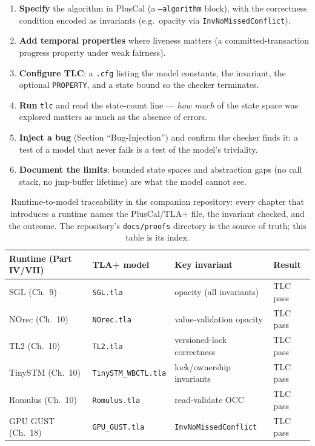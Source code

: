 \begin{enumerate}
    \item \textbf{Specify} the algorithm in PlusCal (a \texttt{--algorithm} block), with the correctness condition encoded as invariants (e.g.\ opacity via \texttt{InvNoMissedConflict}).
    \item \textbf{Add temporal properties} where liveness matters (a committed-transaction progress property under weak fairness).
    \item \textbf{Configure TLC}: a \texttt{.cfg} listing the model constants, the invariant, the optional \texttt{PROPERTY}, and a state bound so the checker terminates.
    \item \textbf{Run} \texttt{tlc} and read the state-count line --- \emph{how much} of the state space was explored matters as much as the absence of errors.
    \item \textbf{Inject a bug} (Section ``Bug-Injection'') and confirm the checker finds it: a test of a model that never fails is a test of the model's triviality.
    \item \textbf{Document the limits}: bounded state spaces and abstraction gaps (no call stack, no jmp-buffer lifetime) are what the model cannot see.
\end{enumerate}

\begin{table}[ht]
\centering
\small
\begin{tabular}{llll}
\hline
\textbf{Runtime (Part IV/VII)} & \textbf{TLA+ model} & \textbf{Key invariant} & \textbf{Result} \\
\hline
SGL (Ch.~9)     & \texttt{SGL.tla}         & opacity (all invariants) & TLC pass \\
NOrec (Ch.~10)   & \texttt{NOrec.tla}       & value-validation opacity  & TLC pass \\
TL2 (Ch.~10)     & \texttt{TL2.tla}         & versioned-lock correctness & TLC pass \\
TinySTM (Ch.~10) & \texttt{TinySTM\_WBCTL.tla} & lock/ownership invariants & TLC pass \\
Romulus (Ch.~10) & \texttt{Romulus.tla}     & read-validate OCC          & TLC pass \\
GPU GUST (Ch.~18)& \texttt{GPU\_GUST.tla}  & \texttt{InvNoMissedConflict} & TLC pass \\
\hline
\end{tabular}
\caption{Runtime-to-model traceability in the companion repository: every chapter that introduces a runtime names the PlusCal/TLA+ file, the invariant checked, and the outcome. The repository's \texttt{docs/proofs} directory is the source of truth; this table is its index.}
\label{tab:traceability}
\end{table}

